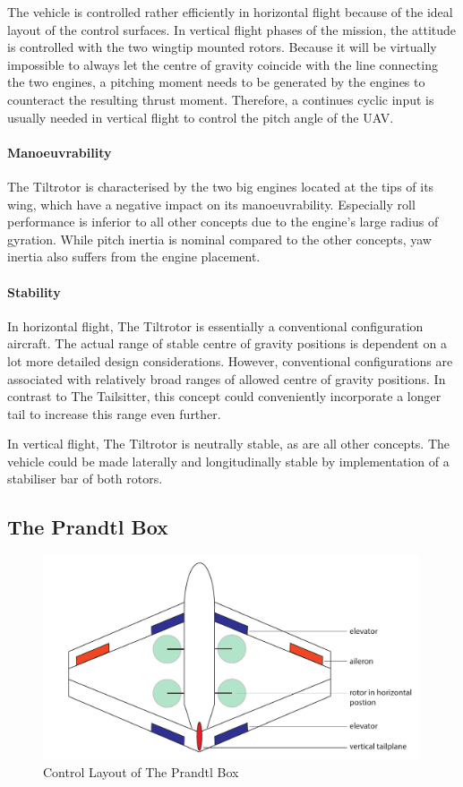 The vehicle is controlled rather efficiently in horizontal flight because of the ideal layout of the control surfaces. In vertical flight phases of the mission, the attitude is controlled with the two wingtip mounted rotors. Because it will be virtually impossible to always let the centre of gravity coincide with the line connecting the two engines, a pitching moment needs to be generated by the engines to counteract the resulting thrust moment. Therefore, a continues cyclic input is usually needed in vertical flight to control the pitch angle of the UAV. 

\paragraph{Manoeuvrability}

The Tiltrotor is characterised by the two big engines located at the tips of its wing, which have a negative impact on its manoeuvrability. Especially roll performance is inferior to all other concepts due to the engine's large radius of gyration. While pitch inertia is nominal compared to the other concepts, yaw inertia also suffers from the engine placement. 

\paragraph{Stability}

In horizontal flight, The Tiltrotor is essentially a conventional configuration aircraft. The actual range of stable centre of gravity positions is dependent on a lot more detailed design considerations. However, conventional configurations are associated with relatively broad ranges of allowed centre of gravity positions. In contrast to The Tailsitter, this concept could conveniently incorporate a longer tail to increase this range even further. 

In vertical flight, The Tiltrotor is neutrally stable, as are all other concepts. The vehicle could be made laterally and longitudinally stable by implementation of a stabiliser bar of both rotors. 

\subsection{The Prandtl Box}
\begin{figure}[htb]
    \centering
    \includegraphics[height=6cm]{Stability/Figures/concept_3.pdf}
    \caption{Control Layout of The Prandtl Box}
    \label{fig:Cpb}
\end{figure}
